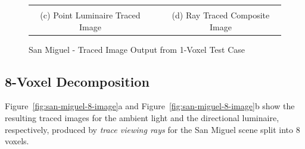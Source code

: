 \begin{figure}[!htb]
{\begin{tabular}{ c c c }
{}
\\
(c) Point Luminaire Traced Image & \hspace{0.1in} & (d) Ray Traced Composite
Image
\end{tabular}}
\caption{San Miguel - Traced Image Output from 1-Voxel Test Case}
\label{fig:san-miguel-1}
\end{figure}

\subsection{8-Voxel Decomposition}
Figure~\ref{fig:san-miguel-8-image}a and Figure~\ref{fig:san-miguel-8-image}b
show the resulting traced images for the ambient light and the directional
luminaire, respectively, produced by \emph{trace viewing rays} for the San
Miguel scene split into 8 voxels. 

